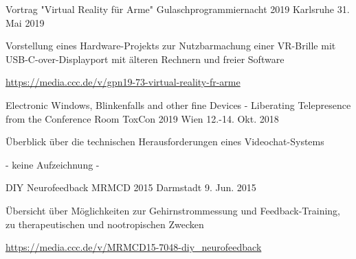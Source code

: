 

\begin{cventries}

  \cventry
    { Vortrag "Virtual Reality für Arme" } %
    {Gulaschprogrammiernacht 2019} %
    {Karlsruhe} %
    {31. Mai 2019} %
    {
      \begin{cvitems} %
        \item {Vorstellung eines Hardware-Projekts zur Nutzbarmachung einer VR-Brille mit USB-C-over-Displayport mit älteren Rechnern und freier Software}
        \item {\href{https://media.ccc.de/v/gpn19-73-virtual-reality-fr-arme }{https://media.ccc.de/v/gpn19-73-virtual-reality-fr-arme } }
      \end{cvitems}
    }

  \cventry
    { Electronic Windows, Blinkenfalls and other fine Devices - Liberating Telepresence from the Conference Room } %
    {ToxCon 2019} %
    {Wien} %
    {12.-14. Okt. 2018} %
    {
      \begin{cvitems} %
        \item { Überblick über die technischen Herausforderungen eines Videochat-Systems }
        \item { - keine Aufzeichnung - }
      \end{cvitems}
    }


  \cventry
    { DIY Neurofeedback } %
    {MRMCD 2015} %
    {Darmstadt} %
    {9. Jun. 2015} %
    {
      \begin{cvitems} %
        \item {Übersicht über Möglichkeiten zur Gehirnstrommessung und Feedback-Training, zu therapeutischen und nootropischen Zwecken}
        \item {\href{https://media.ccc.de/v/MRMCD15-7048-diy\_neurofeedback }{https://media.ccc.de/v/MRMCD15-7048-diy\_neurofeedback } }
      \end{cvitems}
    }

\end{cventries}
